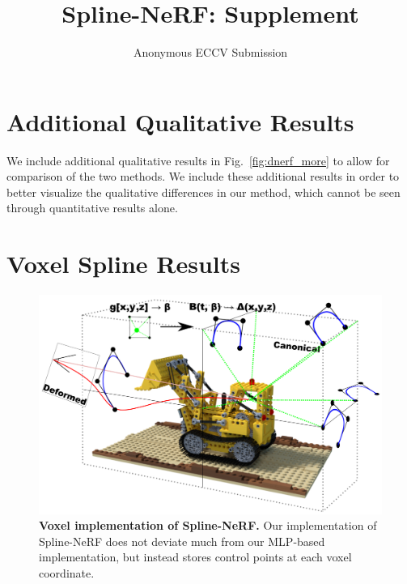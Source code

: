 \documentclass[runningheads]{llncs}
\begin{document}
\pagestyle{headings}
\mainmatter
\def\ECCVSubNumber{6195}

\title{Spline-NeRF: Supplement}
\author{Anonymous ECCV Submission}
\institute{Paper ID \ECCVSubNumber}

\maketitle

\section*{Additional Qualitative Results}

We include additional qualitative results in Fig.~\ref{fig:dnerf_more} to allow for comparison of the two methods. We include these additional results in order to better visualize the qualitative differences in our method, which cannot be seen through quantitative results alone.

\section*{Voxel Spline Results}


\begin{figure}
    \vspace{-6mm}
    \centering
    \begin{minipage}[c]{0.5\textwidth}
    \includegraphics[width=\textwidth]{voxel_spline}
    \end{minipage}
    \begin{minipage}[c]{0.45\textwidth}
    \caption{
        \label{fig:voxel_diagram}
        \textbf{Voxel implementation of Spline-NeRF.}
        Our implementation of Spline-NeRF does not deviate much from our MLP-based implementation, but instead stores control points at each voxel coordinate.
    }
    \end{minipage}
    \vspace{-10mm}
\end{figure}
\end{document}
